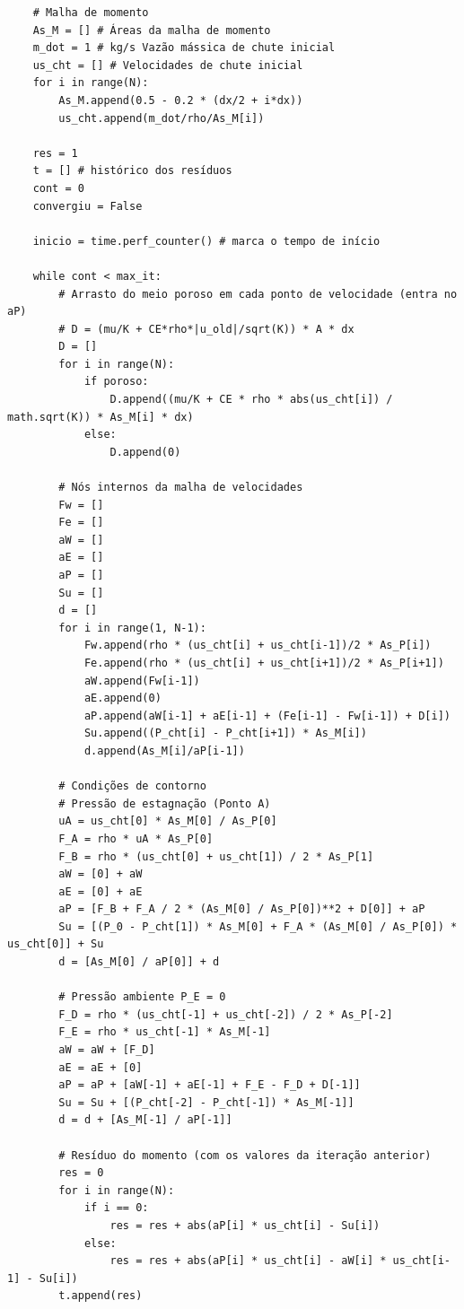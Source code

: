 {\begin{verbatim}
    # Malha de momento
    As_M = [] # Áreas da malha de momento
    m_dot = 1 # kg/s Vazão mássica de chute inicial
    us_cht = [] # Velocidades de chute inicial
    for i in range(N):
        As_M.append(0.5 - 0.2 * (dx/2 + i*dx))
        us_cht.append(m_dot/rho/As_M[i])

    res = 1
    t = [] # histórico dos resíduos
    cont = 0
    convergiu = False

    inicio = time.perf_counter() # marca o tempo de início

    while cont < max_it:
        # Arrasto do meio poroso em cada ponto de velocidade (entra no aP)
        # D = (mu/K + CE*rho*|u_old|/sqrt(K)) * A * dx
        D = []
        for i in range(N):
            if poroso:
                D.append((mu/K + CE * rho * abs(us_cht[i]) / math.sqrt(K)) * As_M[i] * dx)
            else:
                D.append(0)

        # Nós internos da malha de velocidades
        Fw = []
        Fe = []
        aW = []
        aE = []
        aP = []
        Su = []
        d = []
        for i in range(1, N-1):
            Fw.append(rho * (us_cht[i] + us_cht[i-1])/2 * As_P[i])
            Fe.append(rho * (us_cht[i] + us_cht[i+1])/2 * As_P[i+1])
            aW.append(Fw[i-1])
            aE.append(0)
            aP.append(aW[i-1] + aE[i-1] + (Fe[i-1] - Fw[i-1]) + D[i])
            Su.append((P_cht[i] - P_cht[i+1]) * As_M[i])
            d.append(As_M[i]/aP[i-1])

        # Condições de contorno
        # Pressão de estagnação (Ponto A)
        uA = us_cht[0] * As_M[0] / As_P[0]
        F_A = rho * uA * As_P[0]
        F_B = rho * (us_cht[0] + us_cht[1]) / 2 * As_P[1]
        aW = [0] + aW
        aE = [0] + aE
        aP = [F_B + F_A / 2 * (As_M[0] / As_P[0])**2 + D[0]] + aP
        Su = [(P_0 - P_cht[1]) * As_M[0] + F_A * (As_M[0] / As_P[0]) * us_cht[0]] + Su
        d = [As_M[0] / aP[0]] + d

        # Pressão ambiente P_E = 0
        F_D = rho * (us_cht[-1] + us_cht[-2]) / 2 * As_P[-2]
        F_E = rho * us_cht[-1] * As_M[-1]
        aW = aW + [F_D]
        aE = aE + [0]
        aP = aP + [aW[-1] + aE[-1] + F_E - F_D + D[-1]]
        Su = Su + [(P_cht[-2] - P_cht[-1]) * As_M[-1]]
        d = d + [As_M[-1] / aP[-1]]

        # Resíduo do momento (com os valores da iteração anterior)
        res = 0
        for i in range(N):
            if i == 0:
                res = res + abs(aP[i] * us_cht[i] - Su[i])
            else:
                res = res + abs(aP[i] * us_cht[i] - aW[i] * us_cht[i-1] - Su[i])
        t.append(res)


\end{verbatim}}
